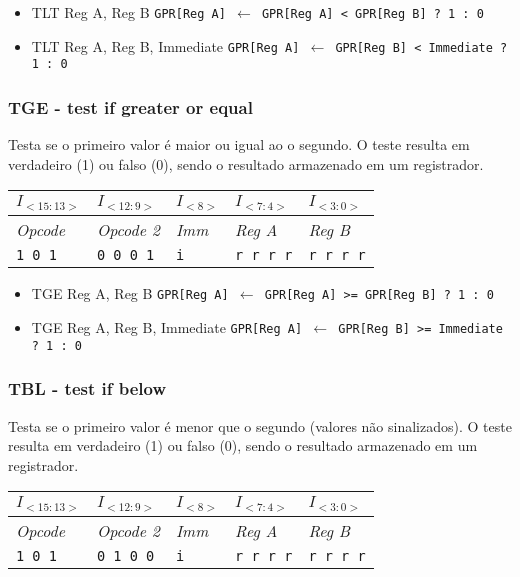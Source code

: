 \documentclass[11pt,a4paper]{report}
\begin{document}
\begin{itemize}
\item TLT Reg A, Reg B
\subitem \texttt{GPR[Reg A] $\leftarrow$ GPR[Reg A] < GPR[Reg B] ? 1 : 0}
\item TLT Reg A, Reg B, Immediate
\subitem \texttt{GPR[Reg A] $\leftarrow$ GPR[Reg B] < Immediate ? 1 : 0}
\end{itemize}

\subsubsection{TGE - test if greater or equal}
Testa se o primeiro valor é maior ou igual ao o segundo. O teste resulta
em verdadeiro (1) ou falso (0), sendo o resultado armazenado em um
registrador.

\begin{table}[htb!]
\centering
\begin{tabular}{|p{2cm}|p{2cm}|p{2cm}|p{2cm}|p{2cm}|}
\hline
$I_{<15:13>}$ & $I_{<12:9>}$ & $I_{<8>}$ & $I_{<7:4>}$ & $I_{<3:0>}$  \\ \hline
\textit{Opcode} & \textit{Opcode 2} & \textit{Imm} & \textit{Reg A} & \textit{Reg B} \\ \hline
\texttt{1 0 1} & \texttt{0 0 0 1} & \texttt{i} & \texttt{r r r r} & \texttt{r r r r} \\ \hline
\end{tabular}
\end{table}

\begin{itemize}
\item TGE Reg A, Reg B
\subitem \texttt{GPR[Reg A] $\leftarrow$ GPR[Reg A] >= GPR[Reg B] ? 1 : 0}
\item TGE Reg A, Reg B, Immediate
\subitem \texttt{GPR[Reg A] $\leftarrow$ GPR[Reg B] >= Immediate ? 1 : 0}
\end{itemize}

\subsubsection{TBL - test if below}
Testa se o primeiro valor é menor que o segundo (valores não sinalizados).
O teste resulta em verdadeiro (1) ou falso (0), sendo o resultado
armazenado em um registrador.

\begin{table}[htb!]
\centering
\begin{tabular}{|p{2cm}|p{2cm}|p{2cm}|p{2cm}|p{2cm}|}
\hline
$I_{<15:13>}$ & $I_{<12:9>}$ & $I_{<8>}$ & $I_{<7:4>}$ & $I_{<3:0>}$  \\ \hline
\textit{Opcode} & \textit{Opcode 2} & \textit{Imm} & \textit{Reg A} & \textit{Reg B} \\ \hline
\texttt{1 0 1} & \texttt{0 1 0 0} & \texttt{i} & \texttt{r r r r} & \texttt{r r r r} \\ \hline
\end{tabular}
\end{table}
\end{document}
